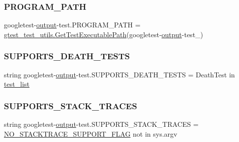 \subsubsection{\texorpdfstring{PROGRAM\_PATH}{PROGRAM\_PATH}}
{\footnotesize\ttfamily googletest-\/\mbox{\hyperlink{namespacegoogletest-output-test_ab3df9ce09186215a36c30454cf282417}{output}}-\/test.\+P\+R\+O\+G\+R\+A\+M\+\_\+\+P\+A\+TH = \mbox{\hyperlink{namespacegtest__test__utils_a89ed3717984a80ffbb7a9c92f71b86a2}{gtest\+\_\+test\+\_\+utils.\+Get\+Test\+Executable\+Path}}(\textquotesingle{}googletest-\/\mbox{\hyperlink{namespacegoogletest-output-test_ab3df9ce09186215a36c30454cf282417}{output}}-\/test\+\_\+\textquotesingle{})}

\mbox{\label{namespacegoogletest-output-test_a3df1558c443e0307fa5a68ec1a698850}} 
\subsubsection{\texorpdfstring{SUPPORTS\_DEATH\_TESTS}{SUPPORTS\_DEATH\_TESTS}}
{\footnotesize\ttfamily string googletest-\/\mbox{\hyperlink{namespacegoogletest-output-test_ab3df9ce09186215a36c30454cf282417}{output}}-\/test.\+S\+U\+P\+P\+O\+R\+T\+S\+\_\+\+D\+E\+A\+T\+H\+\_\+\+T\+E\+S\+TS = \textquotesingle{}Death\+Test\textquotesingle{} in \mbox{\hyperlink{namespacegoogletest-output-test_aa116be76cb5d1da2469f2811706bf08e}{test\+\_\+list}}}

\mbox{\label{namespacegoogletest-output-test_a82e006ce33949232748aa4fcd1d228c5}} 
\subsubsection{\texorpdfstring{SUPPORTS\_STACK\_TRACES}{SUPPORTS\_STACK\_TRACES}}
{\footnotesize\ttfamily string googletest-\/\mbox{\hyperlink{namespacegoogletest-output-test_ab3df9ce09186215a36c30454cf282417}{output}}-\/test.\+S\+U\+P\+P\+O\+R\+T\+S\+\_\+\+S\+T\+A\+C\+K\+\_\+\+T\+R\+A\+C\+ES = \mbox{\hyperlink{namespacegoogletest-output-test_aa5200b284ce09415c0061e96811cf24c}{N\+O\+\_\+\+S\+T\+A\+C\+K\+T\+R\+A\+C\+E\+\_\+\+S\+U\+P\+P\+O\+R\+T\+\_\+\+F\+L\+AG}} not in sys.\+argv}

